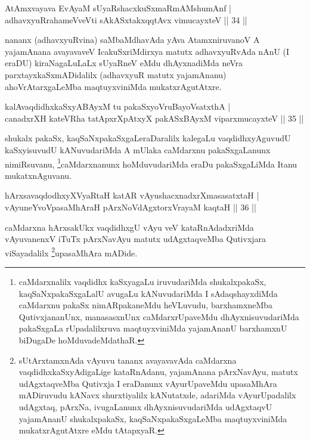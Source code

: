 
\begin{shl}
AtAmxvayava EvAyaM sUyaRshacxkuSxmaRmAMshumAnf |\\
adhavxyuRrahameVveVti sAkASxtakxqqtAvx vimucayxteV \hfill || 34 ||
\end{shl}

\begin{artha}
nananx (adhavxyuRvina) saMbaMdhavAda yAva AtamxniruvanoV A yajamAnana avayavaveV IcakuSxriMdirxya matutx adhavxyuRvAda nAnU (I eraDU) kiraNagaLuLaLx sUyaRneV eMdu dhAyxnadiMda neVra parxtayxkaSxmADidalilx (adhavxyuR matutx yajamAnanu) ahoVrAtarxgaLeMba maqtuyxviniMda mukatxrAgutAtxre.
\end{artha}


\begin{shl}
kalAvaqdidhxkaSxyABAyxM tu pakaSxyoVruBayoVsatxthA |\\
canadxrXH kateVRha tatApxrXpAtxyX pakASxBAyxM viparxmucayxteV \hfill || 35 ||
\end{shl}

\begin{artha}
shukalx pakaSx, kaqSaNxpakaSxgaLeraDaralilx kalegaLu vaqdidhxyAguvudU kaSxyisuvudU kANuvudariMda A mUlaka caMdarxnu pakaSxgaLanunx nimiRsuvanu, \footnote{caMdarxnalilx vaqdidhx kaSxyagaLu iruvudariMda shukalxpakaSx, kaqSaNxpakaSxgaLalU avugaLu kANuvudariMda I sAdaqshayxdiMda caMdarxnu pakaSx nimARpakaneMdu heVLuvudu, barxhamxneMba QutivxjananUnx, manasasxnUnx caMdarxrUpaveMdu dhAyxnisuvudariMda pakaSxgaLa rUpadalilxruva maqtuyxviniMda yajamAnanU barxhamxnU biDugaDe hoMduvadeMdathaR.}caMdarxnanunx hoMduvudariMda eraDu pakaSxgaLiMda Itanu mukatxnAguvanu.
\end{artha}


\begin{shl}
hArxsavaqdodhxyXVyaRtaH katAR vAyushacxnadxrXmasasatxtaH |\\
vAyuneYvoVpasaMhAraH pArxNoVdAgxtorxVrayaM kaqtaH \hfill || 36 ||
\end{shl}

\begin{artha}
caMdarxna hArxsakUkx vaqdidhxgU vAyu veV kataRnAdadxriMda vAyuvanenxV iTuTx pArxNavAyu matutx udAgxtaqveMba Qutivxjara viSayadalilx \footnote{sUtArxtamxnAda vAyuvu tananx avayavavAda caMdarxna vaqdidhxkaSxyAdigaLige kataRnAdanu, yajamAnana pArxNavAyu, matutx udAgxtaqveMba Qutivxja I eraDanunx vAyurUpaveMdu upasaMhAra mADiruvudu kANavx shurxtiyalilx kANutatxde, adariMda vAyurUpadalilx udAgxtaq, pArxNa, ivugaLanunx dhAyxnisuvudariMda udAgxtaqvU yajamAnanU shukalxpakaSx, kaqSaNxpakaSxgaLeMba maqtuyxviniMda mukatxrAgutAtxre \ndash  eMdu tAtapxyaR.}upasaMhAra mADide.
\end{artha}

